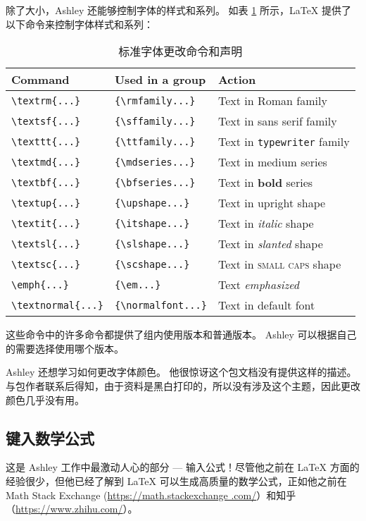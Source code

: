 除了大小，Ashley 还能够控制字体的样式和系列。 如表 \ref{tab:stdfontcmds} 所示，\LaTeX{} 提供了以下命令来控制字体样式和系列：
\begin{table}[htbp]
\begin{tabular}{lll}
Command & Used in a group & Action\\
\hline
\verb=\textrm{...}= & \verb={\rmfamily...}= & {Text in \textrm{Roman} family} \\
\verb=\textsf{...}= & \verb={\sffamily...}= & {Text in \textsf{sans serif} family} \\
\verb=\texttt{...}= & \verb={\ttfamily...}= & {Text in \texttt{typewriter} family} \vspace{.15cm}\\
\verb=\textmd{...}= & \verb={\mdseries...}= & {Text in \textmd{medium} series} \\
\verb=\textbf{...}= & \verb={\bfseries...}= & {Text in \textbf{bold} series} \vspace{.15cm}\\
\verb=\textup{...}= & \verb={\upshape...}= & {Text in \textup{upright} shape} \\
\verb=\textit{...}= & \verb={\itshape...}= & {Text in \textit{italic} shape} \\
\verb=\textsl{...}= & \verb={\slshape...}= & {Text in \textsl{slanted} shape} \\
\verb=\textsc{...}= & \verb={\scshape...}= & {Text in \textsc{small caps} shape} \vspace{.15cm}\\
\verb=\emph{...}= & \verb={\em...}= & {Text \emph{emphasized}}\vspace{.15cm}\\
\verb=\textnormal{...}= & \verb={\normalfont...}= & {Text in default font}
\end{tabular}
\caption{标准字体更改命令和声明}
\label{tab:stdfontcmds}
\end{table}

这些命令中的许多命令都提供了组内使用版本和普通版本。 Ashley 可以根据自己的需要选择使用哪个版本。

Ashley 还想学习如何更改字体颜色。 他很惊讶这个包文档没有提供这样的描述。 与包作者联系后得知，由于资料是黑白打印的，所以没有涉及这个主题，因此更改颜色几乎没有用。

\subsection{键入数学公式}
这是 Ashley 工作中最激动人心的部分 --- 输入公式！尽管他之前在 \LaTeX{} 方面的经验很少，但他已经了解到 \LaTeX{} 可以生成高质量的数学公式，正如他之前在 Math Stack Exchange (\url{https://math.stackexchange .com/}）和知乎（\url{https://www.zhihu.com/}）。

